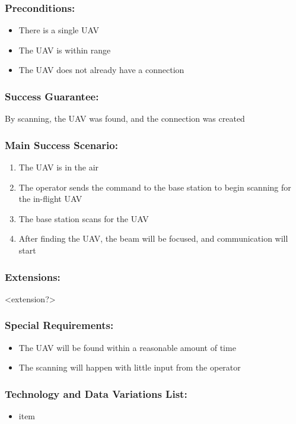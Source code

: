 \documentclass[ProductRequirements.tex]{subfiles}
\begin{document}
		\subsubsection{Preconditions:}
			\begin{itemize}\itemsep1pt
				\item There is a single UAV
				\item The UAV is within range
				\item The UAV does not already have a connection
			\end{itemize}
		\subsubsection{Success Guarantee:}
			By scanning, the UAV was found, and the connection was created
		\subsubsection{Main Success Scenario:}
			\begin{enumerate}\itemsep1pt
				\item The UAV is in the air
				\item The operator sends the command to the base station to begin scanning for the in-flight UAV
				\item The base station scans for the UAV
				\item After finding the UAV, the beam will be focused, and communication will start
			\end{enumerate}
		\subsubsection{Extensions:}
			<extension?>
		\subsubsection{Special Requirements:}
			\begin{itemize}\itemsep1pt
				\item The UAV will be found within a reasonable amount of time
				\item The scanning will happen with little input from the operator
			\end{itemize}
		\subsubsection{Technology and Data Variations List:}
			\begin{itemize}\itemsep1pt
				\item item
			\end{itemize}
\end{document}
